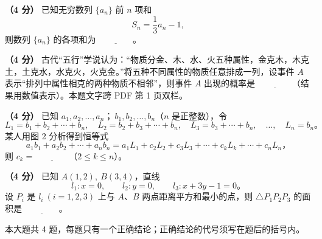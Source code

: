 \begin{question}
\textbf{（4 分）} 已知无穷数列 \(\{a_n\}\) 前 \(n\) 项和
\nopagebreak[4]
\[
S_n=\frac13a_n-1,
\]
则数列 \(\{a_n\}\) 的各项和为 \(\underline{\qquad\qquad}\)。

\end{question}
\begin{question}
\textbf{（4 分）} 古代“五行”学说认为：“物质分金、木、水、火五种属性，金克木，木克土，土克水，水克火，火克金。”将五种不同属性的物质任意排成一列，设事件 \(A\) 表示“排列中属性相克的两种物质不相邻”，则事件 \(A\) 出现的概率是 \(\underline{\qquad\qquad}\)（结果用数值表示）。本题文字跨 PDF 第 1 页双栏。

\Needspace{0.4\textheight}
\end{question}
\begin{question}
\textbf{（4 分）} 已知 \(a_1,a_2,\ldots,a_n\text{；}\ b_1,b_2,\ldots,b_n\)（\(n\) 是正整数），令
\nopagebreak[4]
\[
L_1=b_1+b_2+\cdots+b_n,\quad L_2=b_2+b_3+\cdots+b_n,\quad
L_3=b_3+\cdots+b_n,\quad\ldots,\quad L_n=b_n\text{。}
\]
某人用图 2 分析得到恒等式
\nopagebreak[4]
\[
a_1b_1+a_2b_2+\cdots+a_nb_n
=a_1L_1+c_2L_2+c_3L_3+\cdots+c_kL_k+\cdots+c_nL_n\text{，}
\]
则 \(c_k=\underline{\qquad\qquad}\)（\(2\le k\le n\)）。
\nopagebreak[4]
\begin{center}\end{center}
\nopagebreak[4]
\end{question}
\begin{question}
\textbf{（4 分）} 已知 \(A(1,2),\ B(3,4)\)，直线
\nopagebreak[4]
\[
l_1:x=0,\qquad l_2:y=0,\qquad l_3:x+3y-1=0\text{。}
\]
设 \(P_i\) 是 \(l_i\ (i=1,2,3)\) 上与 \(A\text{、}B\) 两点距离平方和最小的点，则 \(\triangle P_1P_2P_3\) 的面积是 \(\underline{\qquad\qquad}\)。

\end{question}

本大题共 4 题，每题只有一个正确结论；正确结论的代号须写在题后的括号内。

